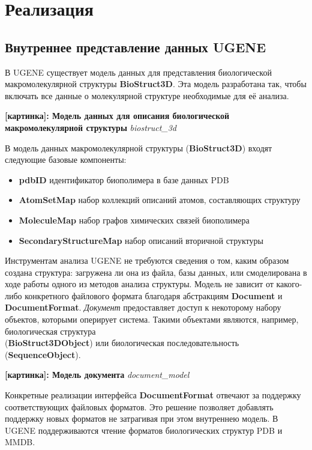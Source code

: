 \documentclass[a4paper, 12pt, titlepage, utf8]{extarticle}
\let\oldsection\section         %
\renewcommand{\section}{\newpage\oldsection}
\newcommand{\ruclass}{\textit}
\newcommand{\class}{\textbf}
\newcommand{\myimage}[2]{   
    \begin{center} \textbf{[картинка]: #1} \textit{#2} \end{center} 
}
\begin{document}
\section{Реализация}
\subsection{Внутреннее представление данных UGENE}
В UGENE существует модель данных для представления биологической макромолекулярной структуры \class{BioStruct3D}. Эта модель разработана так, чтобы включать все данные о молекулярной структуре необходимые для её анализа.

\myimage{Модель данных для описания биологической макромолекулярной структуры}{biostruct\_3d}

В модель данных макромолекулярной структуры (\class{BioStruct3D}) входят следующие базовые компоненты:
\begin{itemize}
    \item \textbf{pdbID} идентификатор биополимера в базе данных PDB 
    \item \textbf{AtomSetMap} набор коллекций описаний атомов, составляющих структуру
    \item \textbf{MoleculeMap} набор графов химических связей биополимера 
    \item \textbf{SecondaryStructureMap} набор описаний вторичной структуры
\end{itemize}

Инструментам анализа UGENE не требуются сведения о том, каким образом создана структура: загружена ли она из файла, базы данных, или смоделирована в ходе работы одного из методов анализа структуры. Модель не зависит от какого-либо конкретного файлового формата  благодаря абстракциям \class{Document} и \class{DocumentFormat}. \ruclass{Документ} предоставляет доступ к некоторому набору объектов, которыми оперирует система. Такими объектами являются, например, биологическая структура \\ (\class{BioStruct3DObject}) или биологическая последовательность (\class{SequenceObject}). 

\myimage{Модель документа}{document\_model}

Конкретные реализации интерфейса \class{DocumentFormat} отвечают за поддержку соответствующих файловых форматов. Это решение позволяет добавлять поддержку новых форматов не затрагивая при этом внутреннею модель. В UGENE поддерживаются чтение форматов биологических структур PDB и MMDB.
\end{document}
